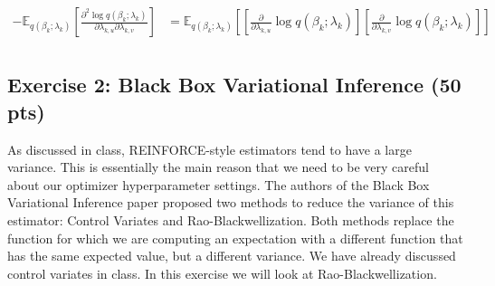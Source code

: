 \documentclass [12pt]{article}
\newcommand{\E}{\ensuremath{\mathbb{E}}}
\begin{document}
\begin{itemize}
\begin{align*}
    -\E_{q(\beta_k; \lambda_k)} \left[ \frac{\partial^2 \log q(\beta_k ; \lambda_k)}{\partial \lambda_{k,u} \partial \lambda_{k,v}} \right] &= \E_{q(\beta_k; \lambda_k)} \left[\left[\frac{\partial }{\partial \lambda_{k,u}} \log q(\beta_k; \lambda_k)\right] \left[ \frac{\partial }{\partial \lambda_{k,v}} \log q(\beta_k; \lambda_k)\right]  \right] \\
\end{align*}


\end{itemize}

\subsection*{Exercise 2: Black Box Variational Inference (50 pts)}

As discussed in class, REINFORCE-style estimators tend to have a large variance. This is essentially the main reason
that we need to be very careful about our optimizer hyperparameter settings. The authors of the Black Box Variational
Inference paper proposed two methods to reduce the variance of this estimator: Control Variates and
Rao-Blackwellization. Both methods replace the function for which we are computing an expectation with a different
function that has the same expected value, but a different variance. We have already discussed control variates in
class. In this exercise we will look at Rao-Blackwellization.
\end{document}
